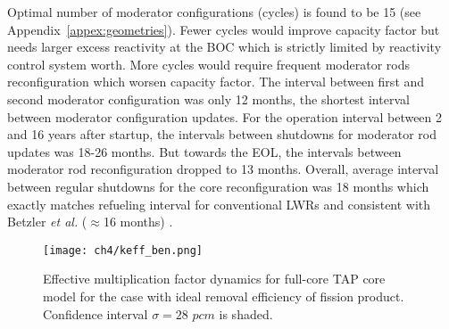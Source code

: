 Optimal number of moderator configurations (cycles) is found to be 15 (see 
Appendix~\ref{appex:geometries}). Fewer cycles would improve capacity factor 
but needs larger excess reactivity at the \gls{BOC} which is strictly limited 
by reactivity control system worth. More cycles would require frequent 
moderator rods reconfiguration which worsen capacity factor.  The interval 
between first and second moderator configuration was only 12 months, the 
shortest interval between moderator configuration updates. For the operation 
interval between 2 and 16 years after startup, the intervals between shutdowns 
for moderator rod updates was 18-26 months. But towards the \gls{EOL}, the 
intervals between moderator rod reconfiguration dropped to 13 months. Overall, 
average interval between regular shutdowns for the core reconfiguration was 18 
months which exactly matches refueling interval for conventional \glspl{LWR}  
and consistent with Betzler \emph{et al.} ($\approx$16 months)  
\cite{betzler_assessment_2017-1}.
\begin{figure}[htp!] %
	\centering
	\texttt{[image: ch4/keff\_ben.png]}
	\caption{Effective multiplication factor dynamics for full-core \gls{TAP} 
		core model for the case with ideal removal efficiency of fission 
		product. 
		Confidence interval $\sigma=28$ $pcm$ is shaded.}
	\label{fig:keff-ben-valid}
\end{figure}

